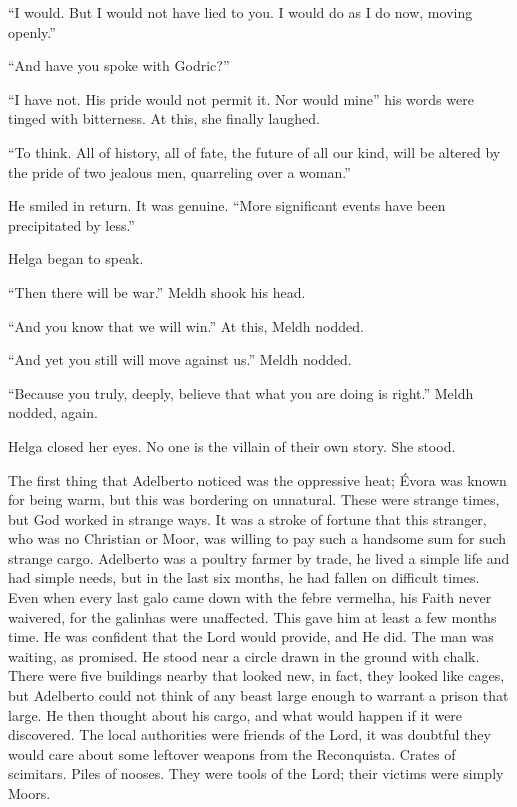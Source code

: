 “I would. But I would not have lied to you. I would do as I do now, moving openly.”

“And have you spoke with Godric?”

“I have not. His pride would not permit it. Nor would mine” his words were tinged with bitterness. At this, she finally laughed.

“To think. All of history, all of fate, the future of all our kind, will be altered by the pride of two jealous men, quarreling over a woman.”

He smiled in return. It was genuine. “More significant events have been precipitated by less.”

Helga began to speak.

“Then there will be war.” Meldh shook his head.

“And you know that we will win.” At this, Meldh nodded.

“And yet you still will move against us.” Meldh nodded.

“Because you truly, deeply, believe that what you are doing is right.” Meldh nodded, again.

Helga closed her eyes. No one is the villain of their own story. She stood.
\simpleline
{}

The first thing that Adelberto noticed was the oppressive heat; Évora was known for being warm, but this was bordering on unnatural. These were strange times, but God worked in strange ways. It was a stroke of fortune that this stranger, who was no Christian or Moor, was willing to pay such a handsome sum for such strange cargo. Adelberto was a poultry farmer by trade, he lived a simple life and had simple needs, but in the last six months, he had fallen on difficult times. Even when every last galo came down with the febre vermelha, his Faith never waivered, for the galinhas were unaffected. This gave him at least a few months time. He was confident that the Lord would provide, and He did.
\SmallVSpace
The man was waiting, as promised. He stood near a circle drawn in the ground with chalk. There were five buildings nearby that looked new, in fact, they looked like cages, but Adelberto could not think of any beast large enough to warrant a prison that large. He then thought about his cargo, and what would happen if it were discovered. The local authorities were friends of the Lord, it was doubtful they would care about some leftover weapons from the Reconquista. Crates of scimitars. Piles of nooses. They were tools of the Lord; their victims were simply Moors.

